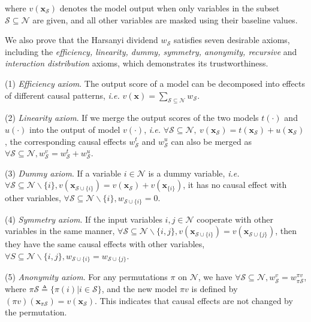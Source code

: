 where {\small$v(\boldsymbol{x}_{\mathcal{S}})$} denotes the model output when only variables in the subset {\small$\mathcal{S}\subseteq\mathcal{N}$} are given, and all other variables are masked using their baseline values.


We also prove that the Harsanyi dividend {\small$w_{\mathcal{S}}$} satisfies seven desirable axioms, including the \textit{efficiency, linearity, dummy, symmetry, anonymity, recursive} and \textit{interaction distribution} axioms, which demonstrates its trustworthiness.

(1) \textit{Efficiency axiom}. The output score of a model can be decomposed into effects of different causal patterns, \emph{i.e.} {\small $v(\boldsymbol{x})=\sum_{\mathcal{S}\subseteq\mathcal{N}}w_{\mathcal{S}}$}.

(2) \textit{Linearity axiom}. If we merge the output scores of the two models $t(\cdot)$ and $u(\cdot)$ into the output of model $v(\cdot)$, \emph{i.e.} {\small $\forall \mathcal{S}\subseteq\mathcal{N},~ v(\boldsymbol{x}_{\mathcal{S}})=t(\boldsymbol{x}_{\mathcal{S}})+u(\boldsymbol{x}_{\mathcal{S}})$}, the corresponding causal effects {\small $w^t_{\mathcal{S}}$} and {\small $w^u_{\mathcal{S}}$} can also be merged as {\small$\forall \mathcal{S}\subseteq \mathcal{N}, w^v_{\mathcal{S}}=w^t_{\mathcal{S}}+w^u_{\mathcal{S}}$}.

(3) \textit{Dummy axiom}. If a variable {\small $i\in\mathcal{N}$} is a dummy variable, \emph{i.e.} 
{\small $\forall \mathcal{S}\subseteq \mathcal{N}\backslash\{i\}, v(\boldsymbol{x}_{\mathcal{S}\cup\{i\}})=v(\boldsymbol{x}_{\mathcal{S}})+v(\boldsymbol{x}_{\{i\}})$}, it has no causal effect with other variables, {\small $\forall \mathcal{S}\subseteq \mathcal{N}\backslash\{i\}, w_{\mathcal{S}\cup\{i\}}=0$}.

(4) \textit{Symmetry axiom}. If the input variables {\small $i,j\in \mathcal{N}$} cooperate with other variables in the same manner, {\small $\forall \mathcal{S}\subseteq \mathcal{N}\backslash\{i,j\}, v(\boldsymbol{x}_{\mathcal{S}\cup\{i\}})=v(\boldsymbol{x}_{\mathcal{S}\cup\{j\}})$}, then they have the same causal effects with other variables, {\small $\forall S\subseteq \mathcal{N}\backslash\{i,j\}, w_{\mathcal{S}\cup\{i\}}=w_{\mathcal{S}\cup\{j\}}$}.

(5) \textit{Anonymity axiom}. For any permutations $\pi$ on {\small $\mathcal{N}$}, we have {\small $\forall \mathcal{S}
\!\subseteq\! \mathcal{N}, w^v_{\mathcal{S}}\!=\!w^{\pi v}_{\pi \mathcal{S}}$}, where {\small $\pi \mathcal{S} \!\triangleq\!\{\pi(i)|i\!\in\!\! \mathcal{S}\}$}, and the new model {\small $\pi v$} is defined by {\small $(\pi v)(\boldsymbol{x}_{\pi\mathcal{S}})\!=\!v(\boldsymbol{x}_{\mathcal{S}})$}.
This indicates that causal effects are not changed by the permutation.

